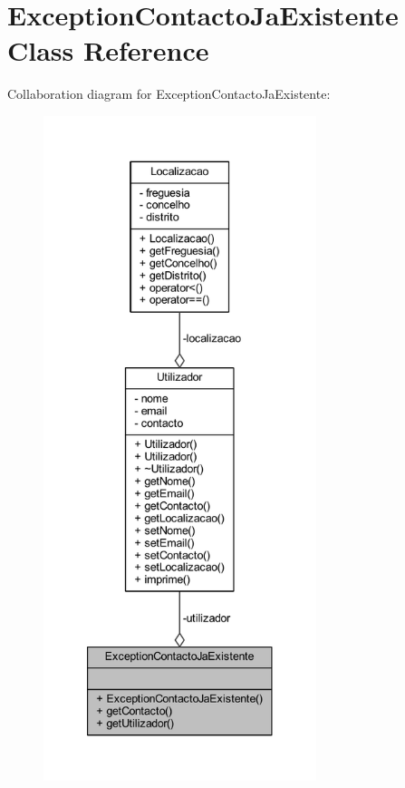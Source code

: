 \hypertarget{class_exception_contacto_ja_existente}{}\section{Exception\+Contacto\+Ja\+Existente Class Reference}
\label{class_exception_contacto_ja_existente}


Collaboration diagram for Exception\+Contacto\+Ja\+Existente\+:\nopagebreak
\begin{figure}[H]
\begin{center}
\leavevmode
\includegraphics[height=550pt]{class_exception_contacto_ja_existente__coll__graph}
\end{center}
\end{figure}
